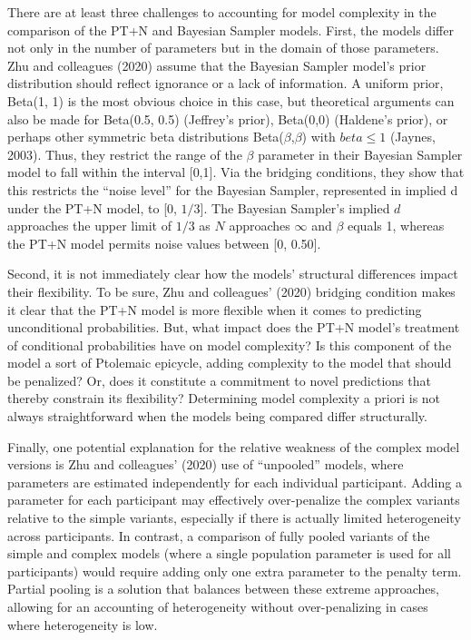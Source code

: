 \documentclass[
  english,
  man,floatsintext]{apa6}
\begin{document}
There are at least three challenges to accounting for model complexity in the comparison of the PT+N and Bayesian Sampler models. First, the models differ not only in the number of parameters but in the domain of those parameters. Zhu and colleagues (2020) assume that the Bayesian Sampler model's prior distribution should reflect ignorance or a lack of information. A uniform prior, Beta(1, 1) is the most obvious choice in this case, but theoretical arguments can also be made for Beta(0.5, 0.5) (Jeffrey's prior), Beta(0,0) (Haldene's prior), or perhaps other symmetric beta distributions Beta(\(\beta\),\(\beta\)) with \(beta \leq 1\) (Jaynes, 2003). Thus, they restrict the range of the \(\beta\) parameter in their Bayesian Sampler model to fall within the interval {[}0,1{]}. Via the bridging conditions, they show that this restricts the ``noise level'' for the Bayesian Sampler, represented in implied d under the PT+N model, to {[}0, \(1/3\){]}. The Bayesian Sampler's implied \(d\) approaches the upper limit of \(1/3\) as \(N\) approaches \(\infty\) and \(\beta\) equals 1, whereas the PT+N model permits noise values between {[}0, 0.50{]}.

Second, it is not immediately clear how the models' structural differences impact their flexibility. To be sure, Zhu and colleagues' (2020) bridging condition makes it clear that the PT+N model is more flexible when it comes to predicting unconditional probabilities. But, what impact does the PT+N model's treatment of conditional probabilities have on model complexity? Is this component of the model a sort of Ptolemaic epicycle, adding complexity to the model that should be penalized? Or, does it constitute a commitment to novel predictions that thereby constrain its flexibility? Determining model complexity a priori is not always straightforward when the models being compared differ structurally.

Finally, one potential explanation for the relative weakness of the complex model versions is Zhu and colleagues' (2020) use of ``unpooled'' models, where parameters are estimated independently for each individual participant. Adding a parameter for each participant may effectively over-penalize the complex variants relative to the simple variants, especially if there is actually limited heterogeneity across participants. In contrast, a comparison of fully pooled variants of the simple and complex models (where a single population parameter is used for all participants) would require adding only one extra parameter to the penalty term. Partial pooling is a solution that balances between these extreme approaches, allowing for an accounting of heterogeneity without over-penalizing in cases where heterogeneity is low.
\end{document}

